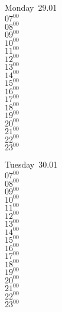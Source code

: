\documentclass[11pt, a4paper]{book}\usepackage[]{graphicx}\usepackage[]{color}
\begin{document}
\begin{headerbox}
\end{headerbox}
\begin{weekdaybox}
  Monday~29.01\\
  { 
  \vfill
  $07^{00}$\\
$08^{00}$\\
$09^{00}$\\
$10^{00}$\\
$11^{00}$\\
$12^{00}$\\
$13^{00}$\\
$14^{00}$\\
$15^{00}$\\
$16^{00}$\\
$17^{00}$\\
$18^{00}$\\
$19^{00}$\\
$20^{00}$\\
$21^{00}$\\
$22^{00}$\\
$23^{00}$\\
  }
\end{weekdaybox}
\begin{weekdaybox}
  Tuesday~30.01\\
  { 
  \vfill
  $07^{00}$\\
$08^{00}$\\
$09^{00}$\\
$10^{00}$\\
$11^{00}$\\
$12^{00}$\\
$13^{00}$\\
$14^{00}$\\
$15^{00}$\\
$16^{00}$\\
$17^{00}$\\
$18^{00}$\\
$19^{00}$\\
$20^{00}$\\
$21^{00}$\\
$22^{00}$\\
$23^{00}$\\
  }
\end{weekdaybox}
\end{document}
